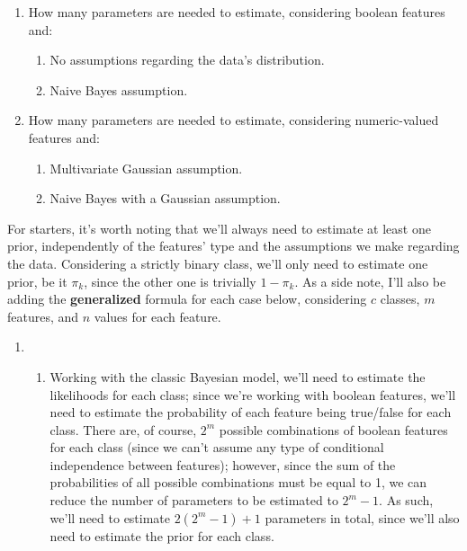 \documentclass[12pt]{article}
\begin{document}
\begin{enumerate}[leftmargin=\labelsep]
{        \begin{enumerate}
          \item How many parameters are needed to estimate, considering boolean features and:
                \begin{enumerate}
                  \item No assumptions regarding the data's distribution.
                  \item Naive Bayes assumption.
                \end{enumerate}
          \item How many parameters are needed to estimate, considering numeric-valued features and:
                \begin{enumerate}
                  \item Multivariate Gaussian assumption.
                  \item Naive Bayes with a Gaussian assumption.
                \end{enumerate}
        \end{enumerate}
        }

        For starters, it's worth noting that we'll always need to estimate at least
        one prior, independently of the features' type and the assumptions we make
        regarding the data. Considering a strictly binary class, we'll only need
        to estimate one prior, be it $\pi_k$, since the other one is trivially $1 - \pi_k$.
        As a side note, I'll also be adding the \textbf{generalized} formula for each
        case below, considering $c$ classes, $m$ features, and $n$ values for each feature.
        \begin{enumerate}
          \item {
                \begin{enumerate}
                  \item {
                        Working with the classic Bayesian model, we'll need to estimate
                        the likelihoods for each class; since we're working with boolean
                        features, we'll need to estimate the probability of each feature
                        being true/false for each class. There are, of course, $2^m$ possible
                        combinations of boolean features for each class (since we can't assume
                        any type of conditional independence between features); however, since
                        the sum of the probabilities of all possible combinations must
                        be equal to 1, we can reduce the number of parameters to be estimated
                        to $2^m - 1$. As such, we'll need to estimate $2(2^m - 1) + 1$ parameters
                        in total, since we'll also need to estimate the prior for each class.

}
\end{enumerate}}
\end{enumerate}
\end{enumerate}
\end{document}
